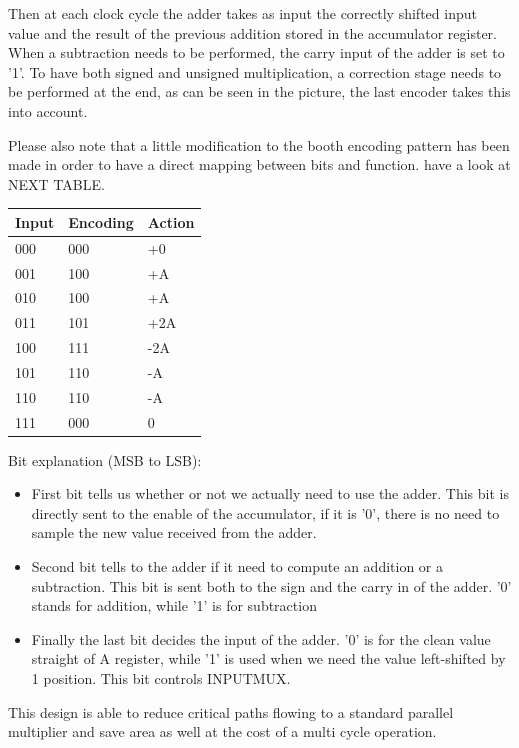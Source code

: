 \documentclass[12pt]{article}
\begin{document}
Then at each clock cycle the adder takes as input the correctly shifted input value and the result of the previous addition stored in the accumulator register. When a subtraction needs to be performed, the carry input of the adder is set to '1'.
To have both signed and unsigned multiplication, a correction stage needs to be performed at the end, as can be seen in the picture, the last encoder takes this into account.

Please also note that a little modification to the booth encoding pattern has been made in order to have a direct mapping between bits and function. have a look at NEXT TABLE.
\begin{center}
	\begin{tabular}{ | l | l | l |}
		\hline
		Input & Encoding & Action \\ \hline
		000 & 000 & +0 \\ \hline
		001 & 100 & +A \\ \hline
		010 & 100 & +A \\ \hline
		011 & 101 & +2A \\ \hline
		100 & 111 & -2A \\ \hline
		101 & 110 & -A \\ \hline
		110 & 110 & -A \\ \hline
		111 & 000 & 0 \\ \hline
		
	\end{tabular}
\end{center}

Bit explanation (MSB to LSB):
\begin{itemize}
	\item First bit tells us whether or not we actually need to use the adder. This bit is directly sent to the enable of the accumulator, if it is '0', there is no need to sample the new value received from the adder.
	\item Second bit tells to the adder if it need to compute an addition or a subtraction. This bit is sent both to the sign and the carry in of the adder. '0' stands for addition, while '1' is for subtraction
	\item Finally the last bit decides the input of the adder. '0' is for the clean value straight of A register, while '1' is used when we need the value left-shifted by 1 position. This bit controls INPUTMUX.
\end{itemize}

This design is able to reduce critical paths flowing to a standard parallel multiplier and save area as well at the cost of a multi cycle operation. 
\end{document}
